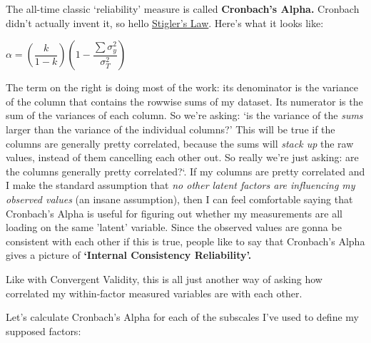 \documentclass[
  letterpaper,
  DIV=11,
  numbers=noendperiod]{scrreprt}
\begin{document}
The all-time classic `reliability' measure is called \textbf{Cronbach's
Alpha.} Cronbach didn't actually invent it, so hello
\href{https://en.wikipedia.org/wiki/Stigler\%27s_law_of_eponymy}{Stigler's
Law}. Here's what it looks like:

\(\alpha = (\dfrac{k}{1-k}) (1 - \dfrac{\sum\sigma_y^2}{\sigma_T^2})\)

The term on the right is doing most of the work: its denominator is the
variance of the column that contains the rowwise sums of my dataset. Its
numerator is the sum of the variances of each column. So we're asking:
`is the variance of the \emph{sums} larger than the variance of the
individual columns?' This will be true if the columns are generally
pretty correlated, because the sums will \emph{stack up} the raw values,
instead of them cancelling each other out. So really we're just asking:
are the columns generally pretty correlated?`. If my columns are pretty
correlated and I make the standard assumption that \emph{no other latent
factors are influencing my observed values} (an insane assumption), then
I can feel comfortable saying that Cronbach's Alpha is useful for
figuring out whether my measurements are all loading on the same
'latent' variable. Since the observed values are gonna be consistent
with each other if this is true, people like to say that Cronbach's
Alpha gives a picture of \textbf{`Internal Consistency Reliability'.}

Like with Convergent Validity, this is all just another way of asking
how correlated my within-factor measured variables are with each other.

Let's calculate Cronbach's Alpha for each of the subscales I've used to
define my supposed factors:
\end{document}
